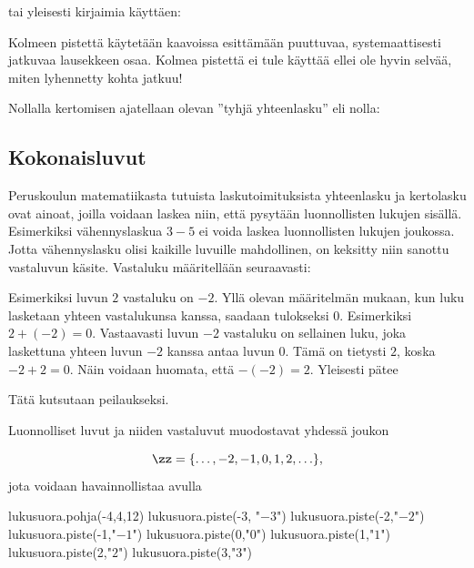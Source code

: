 tai yleisesti kirjaimia käyttäen:

\laatikko{\[m \cdot n = \underbrace{m + m + \ldots + m}_{n\,\text{kpl}} = \underbrace{n + n + \ldots + n}_{m\,\text{kpl}}.\]}

Kolmeen pistettä käytetään kaavoissa esittämään puuttuvaa, systemaattisesti jatkuvaa lausekkeen osaa. Kolmea pistettä ei tule käyttää ellei ole hyvin selvää, miten lyhennetty kohta jatkuu!

Nollalla kertomisen ajatellaan olevan ''tyhjä yhteenlasku'' eli nolla:
\laatikko{\[0 \cdot m = 0\]}


\subsection*{Kokonaisluvut}

Peruskoulun matematiikasta tutuista laskutoimituksista yhteenlasku ja kertolasku ovat ainoat, joilla voidaan laskea niin, että pysytään luonnollisten lukujen sisällä. Esimerkiksi vähennyslaskua $3-5$ ei voida laskea luonnollisten lukujen joukossa. Jotta vähennyslasku olisi kaikille luvuille mahdollinen, on keksitty niin sanottu vastaluvun käsite. Vastaluku määritellään seuraavasti:


Esimerkiksi luvun $2$ vastaluku on $-2$. Yllä olevan määritelmän mukaan, kun luku lasketaan yhteen vastalukunsa kanssa, saadaan tulokseksi $0$. Esimerkiksi $2+(-2)=0$. Vastaavasti luvun $-2$ vastaluku on sellainen luku, joka laskettuna yhteen luvun $-2$ kanssa antaa luvun $0$. Tämä on tietysti $2$, koska $-2+2=0$. Näin voidaan huomata, että $-(-2)=2$. Yleisesti pätee


Tätä kutsutaan peilaukseksi.

Luonnolliset luvut ja niiden vastaluvut muodostavat yhdessä  joukon

\[\zz = \{\ldots, -2, -1, 0, 1, 2, \ldots\},\] jota voidaan havainnollistaa  avulla

\begin{kuva}
	lukusuora.pohja(-4,4,12)
	lukusuora.piste(-3, "$-3$")
	lukusuora.piste(-2,"$-2$")
	lukusuora.piste(-1,"$-1$")
	lukusuora.piste(0,"$0$")
	lukusuora.piste(1,"$1$")
	lukusuora.piste(2,"$2$")
	lukusuora.piste(3,"$3$")
\end{kuva}

